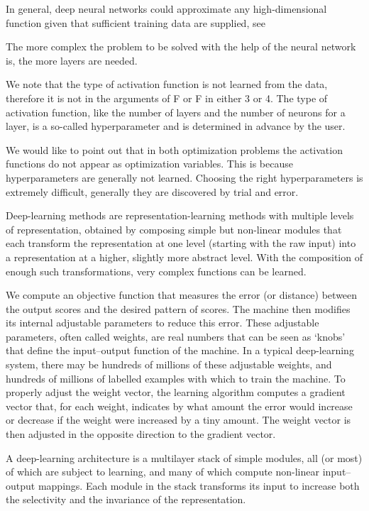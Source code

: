 In general, deep neural networks could approximate any high-dimensional function given that sufficient training data are supplied, see \cite{ArzaniDawson:2021}


The more complex the problem to be solved with the help of the neural network is, the more layers are needed. 

We note that the type of activation function is not learned from the data, therefore it is not in the arguments of F or F in either 3 or 4. The type of activation function, like the number of layers and the number of neurons for a layer, is a so-called hyperparameter and is determined in advance by the user. 

We would like to point out that in both optimization problems the activation functions do not appear as optimization variables. This is because hyperparameters are generally not learned. 
Choosing the right hyperparameters is extremely difficult, generally they are discovered by trial and error. 


Deep-learning methods are representation-learning methods with multiple levels of representation, obtained by composing simple but non-linear modules that each transform the representation at one level (starting with the raw input) into a representation at a higher, slightly more abstract level. With the composition of enough such transformations, very complex functions can be learned.


We compute an objective function that measures the error (or distance) between the output scores and the desired pattern of scores. The machine then modifies its internal adjustable parameters to reduce  this error. These adjustable parameters, often called weights, are real numbers that can be seen as ‘knobs’ that define the input–output function of the machine. In a typical deep-learning system, there may be hundreds of millions of these adjustable weights, and hundreds of millions of labelled examples with which to train the machine. To properly adjust the weight vector, the learning algorithm computes a gradient vector that, for each weight, indicates by what amount the error would increase or decrease if the weight were increased by a tiny amount. The weight vector is then adjusted in the opposite direction to the gradient vector. 

A deep-learning architecture is a multilayer stack of simple modules, all (or most) of which are subject to learning, and many of which compute non-linear input–output mappings. Each module in the stack transforms its input to increase both the selectivity and the invariance of the representation.

